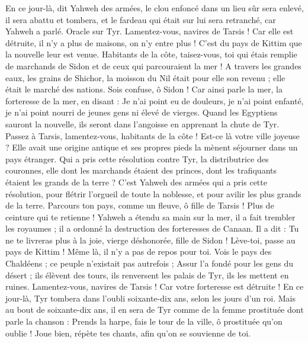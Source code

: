 \begin{multicols}{2}
En ce jour-là, dit Yahweh des armées, le clou enfoncé dans un lieu sûr sera enlevé, il sera abattu et tombera, et le fardeau qui était sur lui sera retranché, car Yahweh a parlé.
\VerseOne{}Oracle sur Tyr. Lamentez-vous, navires de Tarsis ! Car elle est détruite, il n'y a plus de maisons, on n'y entre plus ! C'est du pays de Kittim que la nouvelle leur est venue.
Habitants de la côte, taisez-vous, toi qui étais remplie de marchands de Sidon et de ceux qui parcouraient la mer !
A travers les grandes eaux, les grains de Shichor, la moisson du Nil était pour elle son revenu ; elle était le marché des nations.
Sois confuse, ô Sidon ! Car ainsi parle la mer, la forteresse de la mer, en disant : Je n'ai point eu de douleurs, je n'ai point enfanté, je n'ai point nourri de jeunes gens ni élevé de vierges.
Quand les Egyptiens sauront la nouvelle, ils seront dans l'angoisse en apprenant la chute de Tyr.
Passez à Tarsis, lamentez-vous, habitants de la côte !
Est-ce là votre ville joyeuse ? Elle avait une origine antique et ses propres pieds la mènent séjourner dans un pays étranger.
Qui a pris cette résolution contre Tyr, la distributrice des couronnes, elle dont les marchands étaient des princes, dont les trafiquants étaient les grands de la terre ?
C'est Yahweh des armées qui a pris cette résolution, pour flétrir l'orgueil de toute la noblesse, et pour avilir les plus grands de la terre.
Parcours ton pays, comme un fleuve, ô fille de Tarsis ! Plus de ceinture qui te retienne !
Yahweh a étendu sa main sur la mer, il a fait trembler les royaumes ; il a ordonné la destruction des forteresses de Canaan.
Il a dit : Tu ne te livreras plus à la joie, vierge déshonorée, fille de Sidon ! Lève-toi, passe au pays de Kittim ! Même là, il n'y a pas de repos pour toi.
Vois le pays des Chaldéens ; ce peuple n'existait pas autrefois ; Assur l'a fondé pour les gens du désert ; ils élèvent des tours, ils renversent les palais de Tyr, ils les mettent en ruines.
Lamentez-vous, navires de Tarsis ! Car votre forteresse est détruite !
En ce jour-là, Tyr tombera dans l'oubli soixante-dix ans, selon les jours d'un roi. Mais au bout de soixante-dix ans, il en sera de Tyr comme de la femme prostituée dont parle la chanson :
Prends la harpe, fais le tour de la ville, ô prostituée qu'on oublie ! Joue bien, répète tes chants, afin qu'on se souvienne de toi.

\end{multicols}
